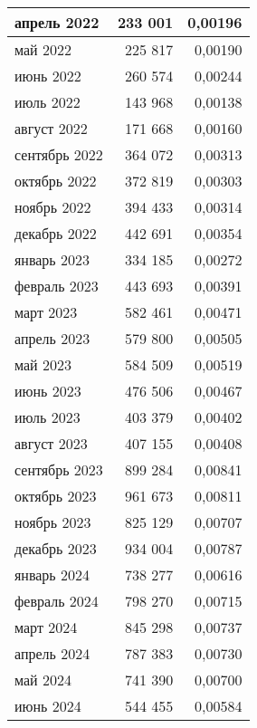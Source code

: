 \begin{longtable}[h!]{|l|r|r|}
\hline
апрель 2022 & 233 001 & 0,00196 \\
\hline
май 2022 & 225 817 & 0,00190 \\
\hline
июнь 2022 & 260 574 & 0,00244 \\
\hline
июль 2022 & 143 968 & 0,00138 \\
\hline
август 2022 & 171 668 & 0,00160 \\
\hline
сентябрь 2022 & 364 072 & 0,00313 \\
\hline
октябрь 2022 & 372 819 & 0,00303 \\
\hline
ноябрь 2022 & 394 433 & 0,00314 \\
\hline
декабрь 2022 & 442 691 & 0,00354 \\
\hline
январь 2023 & 334 185 & 0,00272 \\
\hline
февраль 2023 & 443 693 & 0,00391 \\
\hline
март 2023 & 582 461 & 0,00471 \\
\hline
апрель 2023 & 579 800 & 0,00505 \\
\hline
май 2023 & 584 509 & 0,00519 \\
\hline
июнь 2023 & 476 506 & 0,00467 \\
\hline
июль 2023 & 403 379 & 0,00402 \\
\hline
август 2023 & 407 155 & 0,00408 \\
\hline
сентябрь 2023 & 899 284 & 0,00841 \\
\hline
октябрь 2023 & 961 673 & 0,00811 \\
\hline
ноябрь 2023 & 825 129 & 0,00707 \\
\hline
декабрь 2023 & 934 004 & 0,00787 \\
\hline
январь 2024 & 738 277 & 0,00616 \\
\hline
февраль 2024 & 798 270 & 0,00715 \\
\hline
март 2024 & 845 298 & 0,00737 \\
\hline
апрель 2024 & 787 383 & 0,00730 \\
\hline
май 2024 & 741 390 & 0,00700 \\
\hline
июнь 2024 & 544 455 & 0,00584 \\
\hline
\end{longtable}
\endgroup



